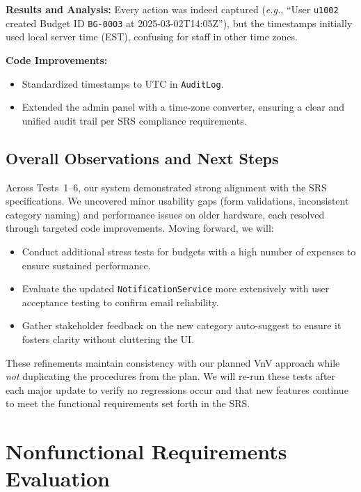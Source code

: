 \documentclass[12pt, titlepage]{article}
\begin{document}
\noindent
\textbf{Results and Analysis:}  
Every action was indeed captured (\emph{e.g.}, “User \texttt{u1002} created Budget ID \texttt{BG-0003} at 2025-03-02T14:05Z”), but the timestamps initially used local server time (EST), confusing for staff in other time zones.

\noindent
\textbf{Code Improvements:}
\begin{itemize}
  \item Standardized timestamps to UTC in \texttt{AuditLog}.
  \item Extended the admin panel with a time-zone converter, ensuring a clear and unified audit trail per SRS compliance requirements.
\end{itemize}

\subsection{Overall Observations and Next Steps}

Across Tests~1--6, our system demonstrated strong alignment with the SRS specifications. We uncovered minor usability gaps (form validations, inconsistent category naming) and performance issues on older hardware, each resolved through targeted code improvements. Moving forward, we will:
\begin{itemize}
  \item Conduct additional stress tests for budgets with a high number of expenses to ensure sustained performance.
  \item Evaluate the updated \texttt{NotificationService} more extensively with user acceptance testing to confirm email reliability.
  \item Gather stakeholder feedback on the new category auto-suggest to ensure it fosters clarity without cluttering the UI.
\end{itemize}

These refinements maintain consistency with our planned VnV approach while \emph{not} duplicating the procedures from the plan. We will re-run these tests after each major update to verify no regressions occur and that new features continue to meet the functional requirements set forth in the SRS.




\section{Nonfunctional Requirements Evaluation}
\label{sec:NonfunctionalReqEval}
\end{document}
